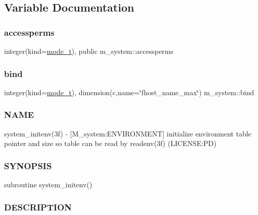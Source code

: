 \subsection{Variable Documentation}
\mbox{\label{namespacem__system_a82a13cb7ac2c5f0e6e34fc3cfc010d42}} 
\subsubsection{\texorpdfstring{accessperms}{accessperms}}
{\footnotesize\ttfamily integer(kind=\mbox{\hyperlink{namespacem__system_abdb5cc27c945379d844db4830d499050}{mode\+\_\+t}}), public m\+\_\+system\+::accessperms}

\mbox{\label{namespacem__system_a7d597052e9d23e2d899e6f81a4509c70}} 
\subsubsection{\texorpdfstring{bind}{bind}}
{\footnotesize\ttfamily integer(kind=\mbox{\hyperlink{namespacem__system_abdb5cc27c945379d844db4830d499050}{mode\+\_\+t}}), dimension(c,name=\char`\"{}fhost\+\_\+name\+\_\+max\char`\"{}) m\+\_\+system\+::bind\hspace{0.3cm}{\ttfamily [private]}}



\subsubsection*{N\+A\+ME}

system\+\_\+initenv(3f) -\/ \mbox{[}M\+\_\+system\+:E\+N\+V\+I\+R\+O\+N\+M\+E\+NT\mbox{]} initialize environment table pointer and size so table can be read by readenv(3f) (L\+I\+C\+E\+N\+SE\+:PD) \subsubsection*{S\+Y\+N\+O\+P\+S\+IS}

subroutine system\+\_\+initenv() \subsubsection*{D\+E\+S\+C\+R\+I\+P\+T\+I\+ON}

